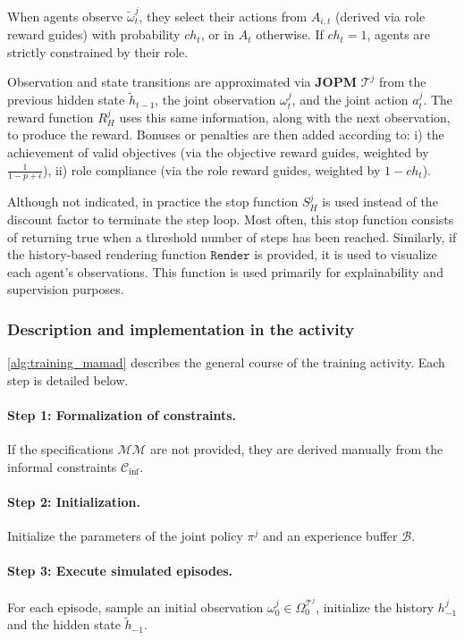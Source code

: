 \documentclass[pdflatex,sn-mathphys-num]{sn-jnl}%
\theoremstyle{thmstyleone}%
\theoremstyle{thmstyletwo}%
\theoremstyle{thmstylethree}%
\begin{document}
When agents observe $\tilde{\omega}_t^j$, they select their actions from $A_{i,t}$ (derived via role reward guides) with probability $ch_t$, or in $A_t$ otherwise. If $ch_t = 1$, agents are strictly constrained by their role.

Observation and state transitions are approximated via \textbf{JOPM} $\mathcal{T}^j$ from the previous hidden state $\tilde{h}_{t-1}$, the joint observation $\omega^j_t$, and the joint action $a^j_t$. The reward function $R^j_H$ uses this same information, along with the next observation, to produce the reward. Bonuses or penalties are then added according to:
i) the achievement of valid objectives (via the objective reward guides, weighted by $\frac{1}{1 - p + \epsilon}$),
ii) role compliance (via the role reward guides, weighted by $1 - ch_t$).

Although not indicated, in practice the stop function $S^j_H$ is used instead of the discount factor to terminate the step loop. Most often, this stop function consists of returning true when a threshold number of steps has been reached.
%
Similarly, if the history-based rendering function $\texttt{Render}$ is provided, it is used to visualize each agent's observations. This function is used primarily for explainability and supervision purposes.


\subsubsection*{Description and implementation in the activity}

\autoref{alg:training_mamad} describes the general course of the training activity.
Each step is detailed below.

\paragraph*{Step 1: Formalization of constraints.}
If the specifications $\mathcal{MM}$ are not provided, they are derived manually from the informal constraints $\mathcal{C}_{\text{inf}}$.

\paragraph*{Step 2: Initialization.}
Initialize the parameters of the joint policy $\pi^j$ and an experience buffer $\mathcal{B}$.

\paragraph*{Step 3: Execute simulated episodes.}
For each episode, sample an initial observation $\omega_0^j \in \Omega^{\mathcal{T}^j}_0$, initialize the history $h_{-1}^j$ and the hidden state $\tilde{h}_{-1}$.
\end{document}
